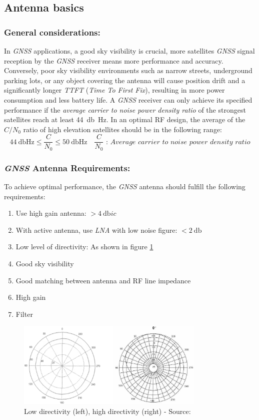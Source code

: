 \documentclass[report.tex]{subfiles}
\begin{document}
\subsection{Antenna basics}
\subsubsection{General considerations:}

In \textit{GNSS} applications, a good sky visibility is crucial, more satellites \textit{GNSS} signal reception by the \textit{GNSS} receiver means more performance and accuracy. Conversely, poor sky visibility environments such as narrow streets, underground parking lots, or any object covering the antenna will cause position drift and a significantly longer \textit{TTFT} (\textit{Time To First Fix}), resulting in more power consumption and less battery life. A \textit{GNSS} receiver can only achieve its specified performance if the \textit{average carrier to noise power density ratio} of the strongest satellites reach at least \SI{44}{\decibel\hertz}. In an optimal RF design, the average of the $C/N_0$ ratio of high elevation satellites should be in the following range:
$$
	\boxed{ \SI{44}{\decibel\hertz} \leq \dfrac{C}{N_0} \leq \SI{50}{\decibel\hertz}} \quad  \dfrac{C}{N_0}\textit{ : Average carrier to noise power density ratio}
$$

\subsubsection{\textit{GNSS} Antenna Requirements:}
To achieve optimal performance, the \textit{GNSS} antenna should fulfill the following requirements:
\begin{enumerate}
\item Use high gain antenna: $>\SI{4}{\decibel ic}$
\item With active antenna, use \textit{LNA} with low noise figure: $< \SI{2}{\decibel}$
\item Low level of directivity: As shown in figure \ref{fig:low_direct_gnss}
\item Good sky visibility
\item Good matching between antenna and RF line impedance
\item High gain
\item Filter
\end{enumerate}

\begin{figure}[H]
	\centering
	\includegraphics[width=0.8\textwidth]{Include/Figure/antenna/low_direct_gnss.png}
	\caption{Low directivity (left), high directivity (right) - Source:\cite{gnss_ant_intro}}
	\label{fig:low_direct_gnss}
\end{figure}
\end{document}
